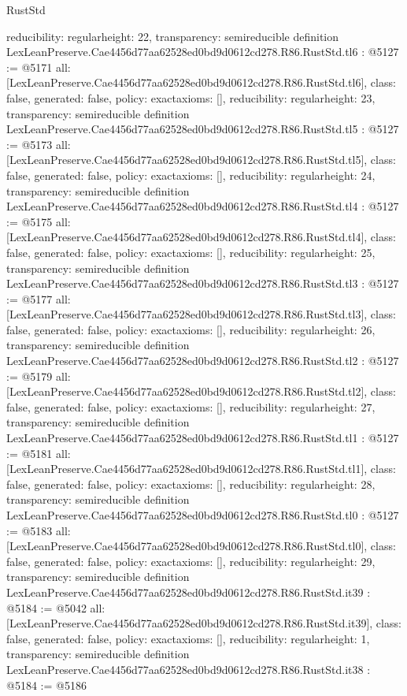 \begin{lexlean}{RustStd}
\begin{coremodule}
{  reducibility: regular{height: 22},
  transparency: semireducible
}
definition LexLeanPreserve.Cae4456d77aa62528ed0bd9d0612cd278.R86.RustStd.tl6 : @5127 := @5171 {
  all: [LexLeanPreserve.Cae4456d77aa62528ed0bd9d0612cd278.R86.RustStd.tl6],
  class: false,
  generated: false,
  policy: exact{axioms: []},
  reducibility: regular{height: 23},
  transparency: semireducible
}
definition LexLeanPreserve.Cae4456d77aa62528ed0bd9d0612cd278.R86.RustStd.tl5 : @5127 := @5173 {
  all: [LexLeanPreserve.Cae4456d77aa62528ed0bd9d0612cd278.R86.RustStd.tl5],
  class: false,
  generated: false,
  policy: exact{axioms: []},
  reducibility: regular{height: 24},
  transparency: semireducible
}
definition LexLeanPreserve.Cae4456d77aa62528ed0bd9d0612cd278.R86.RustStd.tl4 : @5127 := @5175 {
  all: [LexLeanPreserve.Cae4456d77aa62528ed0bd9d0612cd278.R86.RustStd.tl4],
  class: false,
  generated: false,
  policy: exact{axioms: []},
  reducibility: regular{height: 25},
  transparency: semireducible
}
definition LexLeanPreserve.Cae4456d77aa62528ed0bd9d0612cd278.R86.RustStd.tl3 : @5127 := @5177 {
  all: [LexLeanPreserve.Cae4456d77aa62528ed0bd9d0612cd278.R86.RustStd.tl3],
  class: false,
  generated: false,
  policy: exact{axioms: []},
  reducibility: regular{height: 26},
  transparency: semireducible
}
definition LexLeanPreserve.Cae4456d77aa62528ed0bd9d0612cd278.R86.RustStd.tl2 : @5127 := @5179 {
  all: [LexLeanPreserve.Cae4456d77aa62528ed0bd9d0612cd278.R86.RustStd.tl2],
  class: false,
  generated: false,
  policy: exact{axioms: []},
  reducibility: regular{height: 27},
  transparency: semireducible
}
definition LexLeanPreserve.Cae4456d77aa62528ed0bd9d0612cd278.R86.RustStd.tl1 : @5127 := @5181 {
  all: [LexLeanPreserve.Cae4456d77aa62528ed0bd9d0612cd278.R86.RustStd.tl1],
  class: false,
  generated: false,
  policy: exact{axioms: []},
  reducibility: regular{height: 28},
  transparency: semireducible
}
definition LexLeanPreserve.Cae4456d77aa62528ed0bd9d0612cd278.R86.RustStd.tl0 : @5127 := @5183 {
  all: [LexLeanPreserve.Cae4456d77aa62528ed0bd9d0612cd278.R86.RustStd.tl0],
  class: false,
  generated: false,
  policy: exact{axioms: []},
  reducibility: regular{height: 29},
  transparency: semireducible
}
definition LexLeanPreserve.Cae4456d77aa62528ed0bd9d0612cd278.R86.RustStd.it39 : @5184 := @5042 {
  all: [LexLeanPreserve.Cae4456d77aa62528ed0bd9d0612cd278.R86.RustStd.it39],
  class: false,
  generated: false,
  policy: exact{axioms: []},
  reducibility: regular{height: 1},
  transparency: semireducible
}
definition LexLeanPreserve.Cae4456d77aa62528ed0bd9d0612cd278.R86.RustStd.it38 : @5184 := @5186 {
}
\end{coremodule}
\end{lexlean}
